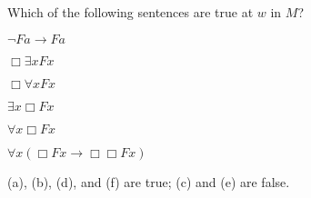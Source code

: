 
\begin{exercise}
  Which of the following sentences are true at $w$ in $M$? 
  \begin{exlist}
  \item $\neg Fa \to Fa$ %
  \item $\Box \exists x Fx$ %
  \item $\Box \forall x Fx$ %
  \item $\exists x \Box Fx$ %
  \item $\forall x \Box Fx$ %
  \item $\forall x (\Box Fx \to \Box\Box Fx)$ %
  \end{exlist}
\end{exercise}
\begin{solution}
  (a), (b), (d), and (f) are true; (c) and (e) are false.
\end{solution}

